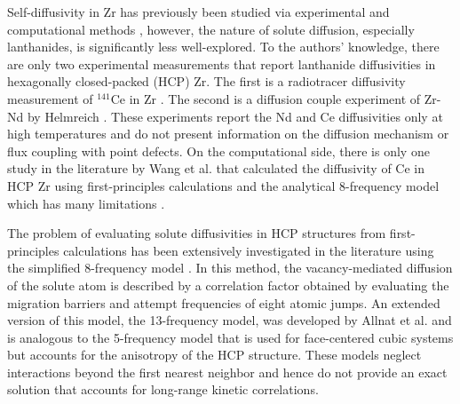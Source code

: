 \documentclass[preprint,12pt]{elsarticle}
\begin{document}
Self-diffusivity in Zr has previously been studied via experimental \cite{hood_alpha-zr_1995, hood_self-_1997} and computational methods \cite{samolyuk_analysis_2014, verite_anisotropy_2007, pasianot_issues_2012}, however, the nature of solute diffusion, especially lanthanides, is significantly less well-explored. To the authors' knowledge, there are only two experimental measurements that report lanthanide diffusivities in hexagonally closed-packed (HCP) Zr. The first is a radiotracer diffusivity measurement of $^{141}$Ce in Zr \cite{paul_diffusion_1968}. The second is a diffusion couple experiment of Zr-Nd by Helmreich \cite{helmreich_diffusion_2014}. These experiments report the Nd and Ce diffusivities only at high temperatures and do not present information on the diffusion mechanism or flux coupling with point defects. On the computational side, there is only one study in the literature by Wang et al. \cite{wang_first_2019} that calculated the diffusivity of Ce in HCP Zr using first-principles calculations and the analytical 8-frequency model which has many limitations \cite{agarwal_exact_2017}. 

The problem of evaluating solute diffusivities in HCP structures from first-principles calculations has been extensively investigated in the literature \cite{ganeshan_first-principles_2011, lu_first-principles_2018, wang_first_2019} using the simplified 8-frequency model \cite{ghate_screened_1964, batra_anisotropic_1967}. In this method, the vacancy-mediated diffusion of the solute atom is described by a correlation factor obtained by evaluating the migration barriers and attempt frequencies of eight atomic jumps. An extended version of this model, the 13-frequency model, was developed by Allnat et al. \cite{allnatt_atomic_2003} and is analogous to the 5-frequency model that is used for face-centered cubic systems but accounts for the anisotropy of the HCP structure. These models neglect interactions beyond the first nearest neighbor and hence do not provide an exact solution that accounts for long-range kinetic correlations. 
\end{document}
